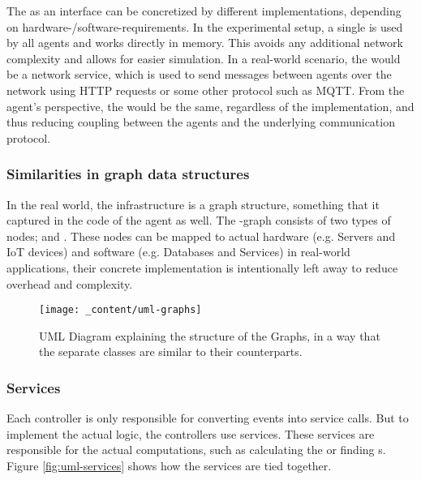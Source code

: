The  as an interface can be concretized by different implementations, depending on hardware-/software-requirements. In the experimental setup, a single  is used by all agents and works directly in memory. This avoids any additional network complexity and allows for easier simulation. In a real-world scenario, the  would be a network service, which is used to send messages between agents over the network using HTTP requests or some other protocol such as MQTT. From the agent's perspective, the  would be the same, regardless of the implementation, and thus reducing coupling between the agents and the underlying communication protocol.

\subsubsection{Similarities in graph data structures}
\label{sssec:graph-data-structures}
In the real world, the infrastructure is a graph structure, something that it  captured in the code of the agent as well. The -graph consists of two types of nodes;  and . These nodes can be mapped to actual hardware (e.g. Servers and IoT devices) and software (e.g. Databases and Services) in real-world applications, their concrete implementation is intentionally left away to reduce overhead and complexity.

\begin{figure}[H]
    \centering
    \texttt{[image: \_content/uml-graphs]}
    \caption{UML Diagram explaining the structure of the Graphs, in a way that the separate classes are similar to their counterparts.}
    \label{fig:uml-graphs}
\end{figure}

\subsubsection{Services}
\label{sssec:services}
Each controller is only responsible for converting events into service calls. But to implement the actual logic, the controllers use services. These services are responsible for the actual computations, such as calculating the  or finding s. Figure \ref{fig:uml-services} shows how the services are tied together.

